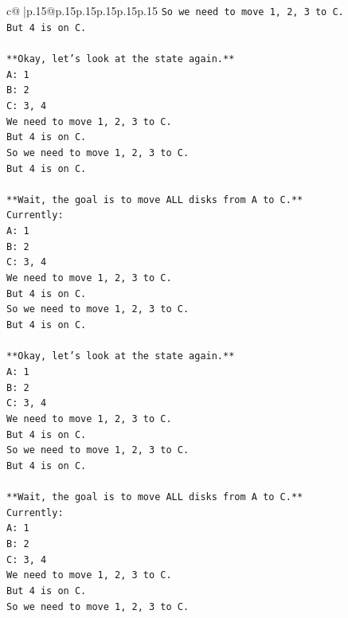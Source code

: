\documentclass{article}
\begin{document}
{\begin{supertabular}{c@{$\;$}|p{.15\linewidth}@{}p{.15\linewidth}p{.15\linewidth}p{.15\linewidth}p{.15\linewidth}p{.15\linewidth}}
{{{\texttt{So we need to move 1, 2, 3 to C.} \\
\texttt{But 4 is on C.} \\
\\ 
\texttt{**Okay, let's look at the state again.**} \\
\texttt{A: 1} \\
\texttt{B: 2} \\
\texttt{C: 3, 4} \\
\texttt{We need to move 1, 2, 3 to C.} \\
\texttt{But 4 is on C.} \\
\texttt{So we need to move 1, 2, 3 to C.} \\
\texttt{But 4 is on C.} \\
\\ 
\texttt{**Wait, the goal is to move ALL disks from A to C.**} \\
\texttt{Currently:} \\
\texttt{A: 1} \\
\texttt{B: 2} \\
\texttt{C: 3, 4} \\
\texttt{We need to move 1, 2, 3 to C.} \\
\texttt{But 4 is on C.} \\
\texttt{So we need to move 1, 2, 3 to C.} \\
\texttt{But 4 is on C.} \\
\\ 
\texttt{**Okay, let's look at the state again.**} \\
\texttt{A: 1} \\
\texttt{B: 2} \\
\texttt{C: 3, 4} \\
\texttt{We need to move 1, 2, 3 to C.} \\
\texttt{But 4 is on C.} \\
\texttt{So we need to move 1, 2, 3 to C.} \\
\texttt{But 4 is on C.} \\
\\ 
\texttt{**Wait, the goal is to move ALL disks from A to C.**} \\
\texttt{Currently:} \\
\texttt{A: 1} \\
\texttt{B: 2} \\
\texttt{C: 3, 4} \\
\texttt{We need to move 1, 2, 3 to C.} \\
\texttt{But 4 is on C.} \\
\texttt{So we need to move 1, 2, 3 to C.} \\
}}}
\end{supertabular}}
\end{document}

